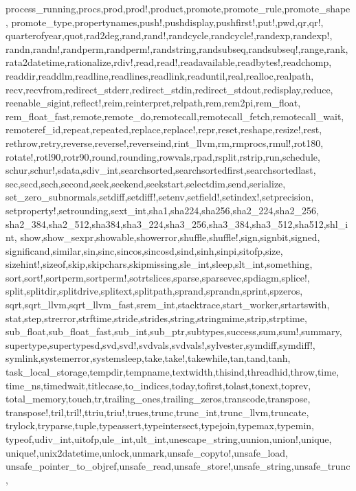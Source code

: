 {{process_running,procs,prod,prod!,product,promote,promote_rule,promote_shape,%
promote_type,propertynames,push!,pushdisplay,pushfirst!,put!,pwd,qr,qr!,%
quarterofyear,quot,rad2deg,rand,rand!,randcycle,randcycle!,randexp,randexp!,%
randn,randn!,randperm,randperm!,randstring,randsubseq,randsubseq!,range,rank,%
rata2datetime,rationalize,rdiv!,read,read!,readavailable,readbytes!,readchomp,%
readdir,readdlm,readline,readlines,readlink,readuntil,real,realloc,realpath,%
recv,recvfrom,redirect_stderr,redirect_stdin,redirect_stdout,redisplay,reduce,%
reenable_sigint,reflect!,reim,reinterpret,relpath,rem,rem2pi,rem_float,%
rem_float_fast,remote,remote_do,remotecall,remotecall_fetch,remotecall_wait,%
remoteref_id,repeat,repeated,replace,replace!,repr,reset,reshape,resize!,rest,%
rethrow,retry,reverse,reverse!,reverseind,rint_llvm,rm,rmprocs,rmul!,rot180,%
rotate!,rotl90,rotr90,round,rounding,rowvals,rpad,rsplit,rstrip,run,schedule,%
schur,schur!,sdata,sdiv_int,searchsorted,searchsortedfirst,searchsortedlast,%
sec,secd,sech,second,seek,seekend,seekstart,selectdim,send,serialize,%
set_zero_subnormals,setdiff,setdiff!,setenv,setfield!,setindex!,setprecision,%
setproperty!,setrounding,sext_int,sha1,sha224,sha256,sha2_224,sha2_256,%
sha2_384,sha2_512,sha384,sha3_224,sha3_256,sha3_384,sha3_512,sha512,shl_int,%
show,show_sexpr,showable,showerror,shuffle,shuffle!,sign,signbit,signed,%
significand,similar,sin,sinc,sincos,sincosd,sind,sinh,sinpi,sitofp,size,%
sizehint!,sizeof,skip,skipchars,skipmissing,sle_int,sleep,slt_int,something,%
sort,sort!,sortperm,sortperm!,sotrtslices,sparse,sparsevec,spdiagm,splice!,%
split,splitdir,splitdrive,splitext,splitpath,sprand,sprandn,sprint,spzeros,%
sqrt,sqrt_llvm,sqrt_llvm_fast,srem_int,stacktrace,start_worker,srtartswith,%
stat,step,strerror,strftime,stride,strides,string,stringmime,strip,strptime,%
sub_float,sub_float_fast,sub_int,sub_ptr,subtypes,success,sum,sum!,summary,%
supertype,supertypesd,svd,svd!,svdvals,svdvals!,sylvester,symdiff,symdiff!,%
symlink,systemerror,systemsleep,take,take!,takewhile,tan,tand,tanh,%
task_local_storage,tempdir,tempname,textwidth,thisind,threadhid,throw,time,%
time_ns,timedwait,titlecase,to_indices,today,tofirst,tolast,tonext,toprev,%
total_memory,touch,tr,trailing_ones,trailing_zeros,transcode,transpose,%
transpose!,tril,tril!,ttriu,triu!,trues,trunc,trunc_int,trunc_llvm,truncate,%
trylock,tryparse,tuple,typeassert,typeintersect,typejoin,typemax,typemin,%
typeof,udiv_int,uitofp,ule_int,ult_int,unescape_string,uunion,union!,unique,%
unique!,unix2datetime,unlock,unmark,unsafe_copyto!,unsafe_load,%
unsafe_pointer_to_objref,unsafe_read,unsafe_store!,unsafe_string,unsafe_trunc,%
}}
